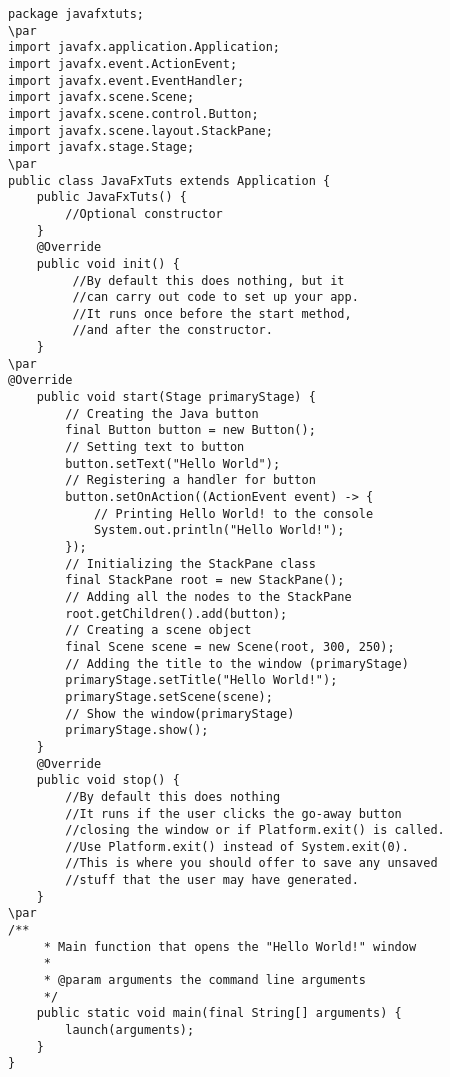 \documentclass{book}
\def\lthtmlcheckvsize{\ifdim\ht\sizebox<\vsize 
  \ifdim\wd\sizebox<\hsize\expandafter\hfill\fi \expandafter\vfill
  \else\expandafter\vss\fi}%
\begin{document}
{\newpage\clearpage
{}%
\begin{lstlisting}
package javafxtuts;
\par
import javafx.application.Application;
import javafx.event.ActionEvent;
import javafx.event.EventHandler;
import javafx.scene.Scene;
import javafx.scene.control.Button;
import javafx.scene.layout.StackPane;
import javafx.stage.Stage;
\par
public class JavaFxTuts extends Application {
    public JavaFxTuts() {
        //Optional constructor
    }
    @Override
    public void init() {
         //By default this does nothing, but it
         //can carry out code to set up your app.
         //It runs once before the start method,
         //and after the constructor.
    }
\par
@Override
    public void start(Stage primaryStage) {
        // Creating the Java button
        final Button button = new Button();
        // Setting text to button
        button.setText("Hello World");
        // Registering a handler for button
        button.setOnAction((ActionEvent event) -> {
            // Printing Hello World! to the console
            System.out.println("Hello World!");
        });
        // Initializing the StackPane class
        final StackPane root = new StackPane();
        // Adding all the nodes to the StackPane
        root.getChildren().add(button);
        // Creating a scene object
        final Scene scene = new Scene(root, 300, 250);
        // Adding the title to the window (primaryStage)
        primaryStage.setTitle("Hello World!");
        primaryStage.setScene(scene);
        // Show the window(primaryStage)
        primaryStage.show();
    }
    @Override
    public void stop() {
        //By default this does nothing
        //It runs if the user clicks the go-away button
        //closing the window or if Platform.exit() is called.
        //Use Platform.exit() instead of System.exit(0).
        //This is where you should offer to save any unsaved
        //stuff that the user may have generated.
    }
\par
/**
     * Main function that opens the "Hello World!" window
     * 
     * @param arguments the command line arguments
     */
    public static void main(final String[] arguments) {
        launch(arguments);
    }
}
\end{lstlisting}%
\lthtmlfigureZ
\lthtmlcheckvsize\clearpage}
\end{document}
